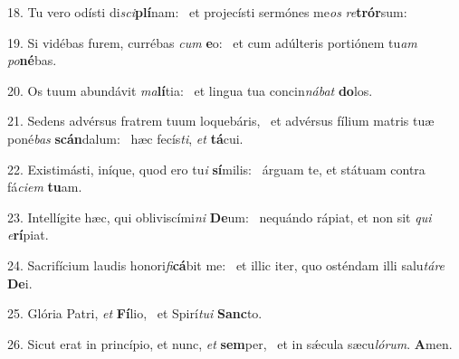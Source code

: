 18. Tu vero odísti di\textit{sci}\textbf{plí}nam: \ast\  et projecísti sermónes me\textit{os} \textit{re}\textbf{trór}sum:\

19. Si vidébas furem, currébas \textit{cum} \textbf{e}o: \ast\  et cum adúlteris portiónem tu\textit{am} \textit{po}\textbf{né}bas.\

20. Os tuum abundávit \textit{ma}\textbf{lí}tia: \ast\  et lingua tua concin\textit{ná}\textit{bat} \textbf{do}los.\

21. Sedens advérsus fratrem tuum loquebáris, \dag\  et advérsus fílium matris tuæ poné\textit{bas} \textbf{scán}dalum: \ast\  hæc fecís\textit{ti}, \textit{et} \textbf{tá}cui.\

22. Existimásti, iníque, quod ero tu\textit{i} \textbf{sí}milis: \ast\  árguam te, et státuam contra fá\textit{ci}\textit{em} \textbf{tu}am.\

23. Intellígite hæc, qui obliviscími\textit{ni} \textbf{De}um: \ast\  nequándo rápiat, et non sit \textit{qui} \textit{e}\textbf{rí}piat.\

24. Sacrifícium laudis honori\textit{fi}\textbf{cá}bit me: \ast\  et illic iter, quo osténdam illi salu\textit{tá}\textit{re} \textbf{De}i.\

25. Glória Patri, \textit{et} \textbf{Fí}lio, \ast\  et Spirí\textit{tu}\textit{i} \textbf{Sanc}to.\

26. Sicut erat in princípio, et nunc, \textit{et} \textbf{sem}per, \ast\  et in sǽcula sæcu\textit{ló}\textit{rum}. \textbf{A}men.\


